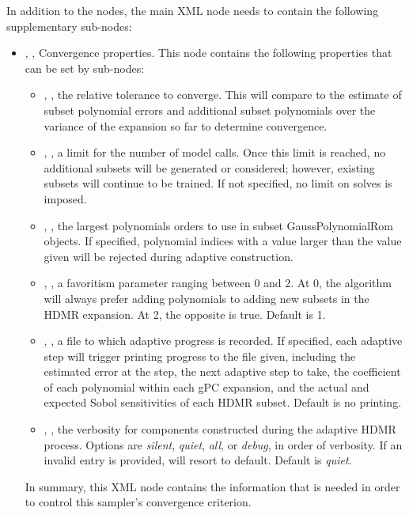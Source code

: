 In addition to the  nodes, the main XML node
 needs to contain the following supplementary sub-nodes:

\begin{itemize}
  \item {}, , Convergence
    properties.
    This node contains the following properties that can be set by sub-nodes:
    \begin{itemize}
      \item {}, , the relative tolerance to converge.
        This will compare to the estimate of subset polynomial errors and additional subset polynomials over
        the variance of the expansion so far to determine convergence.
      \item {}, ,
        a limit for the number of model calls.  Once this limit is reached, no additional subsets
        will be generated or considered; however, existing subsets will continue to be trained.  If not
        specified, no limit on solves is imposed.
      \item {}, ,
        the largest polynomials orders to use in subset GaussPolynomialRom objects.  If specified, polynomial
        indices with a value larger than the value given will be rejected during adaptive construction.
      \item {}, , a favoritism parameter ranging between
        0 and 2.  At 0, the algorithm will always prefer adding polynomials to adding new subsets in the HDMR
        expansion.  At 2, the opposite is true.  Default is 1.
      \item {}, ,
        a file to which adaptive progress is recorded.  If specified, each adaptive step will trigger printing
        progress to the file given, including the estimated error at the step, the next adaptive step to take,
        the coefficient of each polynomial within each gPC expansion, and the actual and expected Sobol
        sensitivities of each HDMR subset. Default is no printing.
      \item {}, , the verbosity for components
        constructed during the adaptive HDMR process.  Options are \emph{silent}, \emph{quiet}, \emph{all}, or
        \emph{debug}, in order of
        verbosity.  If an invalid entry is provided, will resort to default.  Default is \emph{quiet}.
    \end{itemize}
    In summary, this XML node contains the information that is needed in order
    to control this sampler's convergence criterion.
\end{itemize}
